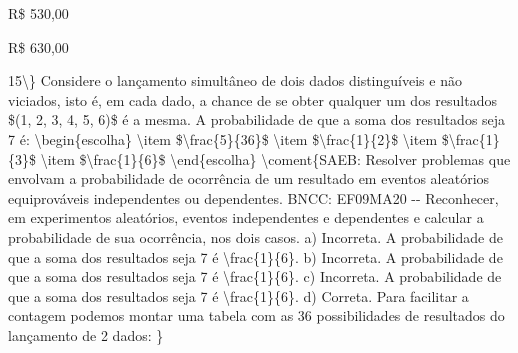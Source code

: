 {{{\begin{escolha}
{{{{{\begin{escolha}
\begin{escolha}
{\begin{q°}
{\begin{escolha}
\begin{escolha}
\begin{escolha}
\begin{escolha}
\begin{escolha}
\begin{escolha}
\begin{escolha}
  \item R\$ 530,00

  \item R\$ 630,00
\end{escolha}


\num{15\} Considere o lançamento simultâneo de dois dados
distinguíveis e não viciados, isto é, em cada dado, a chance de se obter
qualquer um dos resultados $(1, 2, 3, 4, 5, 6)$ é a mesma. A probabilidade
de que a soma dos resultados seja 7 é:

\begin{escolha}

  \item $\frac{5}{36}$

  \item $\frac{1}{2}$

  \item $\frac{1}{3}$

  \item $\frac{1}{6}$

\end{escolha}

\coment{SAEB: Resolver problemas que envolvam a probabilidade de
ocorrência de um resultado em eventos aleatórios equiprováveis
independentes ou dependentes.

BNCC: EF09MA20 -- Reconhecer, em experimentos aleatórios, eventos
independentes e dependentes e calcular a probabilidade de sua
ocorrência, nos dois casos.

a) Incorreta. A probabilidade de que a soma dos resultados seja 
7 é \frac{1}{6}.
b) Incorreta. A probabilidade de que a soma dos resultados seja 
7 é \frac{1}{6}.
c) Incorreta. A probabilidade de que a soma dos resultados seja 
7 é \frac{1}{6}.
d) Correta. Para facilitar a contagem podemos montar uma tabela com as 36
possibilidades de resultados do lançamento de 2 dados:

}}
\end{escolha}
\end{escolha}
\end{escolha}
\end{escolha}
\end{escolha}
\end{escolha}}
\end{q°}}
\end{escolha}
\end{escolha}}}}}}
\end{escolha}}}}

